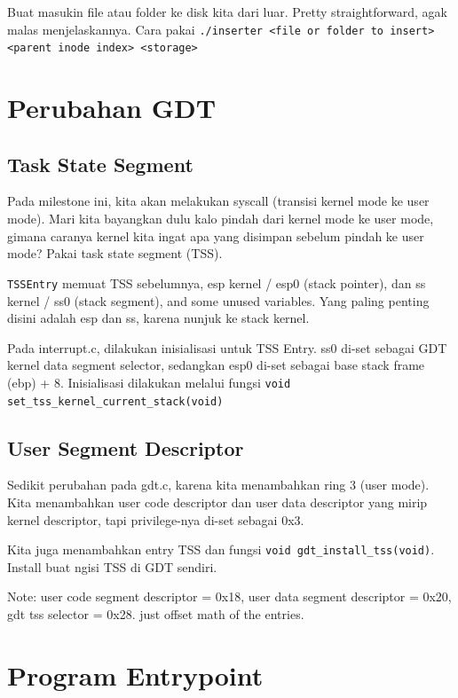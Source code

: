 Buat masukin file atau folder ke disk kita dari luar. Pretty straightforward, agak malas menjelaskannya. Cara pakai \texttt{./inserter <file or folder to insert> <parent inode index> <storage>}

\section{Perubahan GDT}

\subsection{Task State Segment}

Pada milestone ini, kita akan melakukan syscall (transisi kernel mode ke user mode). Mari kita bayangkan dulu kalo pindah dari kernel mode ke user mode, gimana caranya kernel kita ingat apa yang disimpan sebelum pindah ke user mode? Pakai task state segment (TSS).

\texttt{TSSEntry} memuat TSS sebelumnya, esp kernel / esp0 (stack pointer), dan ss kernel / ss0 (stack segment), and some unused variables. Yang paling penting disini adalah esp dan ss, karena nunjuk ke stack kernel.

Pada interrupt.c, dilakukan inisialisasi untuk TSS Entry. ss0 di-set sebagai GDT kernel data segment selector, sedangkan esp0 di-set sebagai base stack frame (ebp) + 8. Inisialisasi dilakukan melalui fungsi \texttt{void set\_tss\_kernel\_current\_stack(void)}

\subsection{User Segment Descriptor}

Sedikit perubahan pada gdt.c, karena kita menambahkan ring 3 (user mode). Kita menambahkan user code descriptor dan user data descriptor yang mirip kernel descriptor, tapi privilege-nya di-set sebagai 0x3.

Kita juga menambahkan entry TSS dan fungsi \texttt{void gdt\_install\_tss(void)}. Install buat ngisi TSS di GDT sendiri.

Note: user code segment descriptor = 0x18, user data segment descriptor = 0x20, gdt tss selector = 0x28. just offset math of the entries.

\section{Program Entrypoint}

